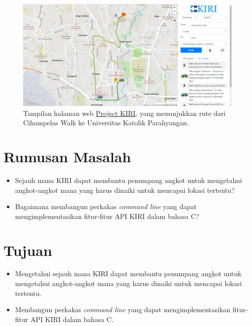 \documentclass[a4paper,twoside]{article}
\begin{document}
\begin{landscape}
    \begin{figure}[ht]
	    \centering
	    \includegraphics[width=\linewidth]{projectkiri}
	    \caption[Tampilan halaman web Project KIRI]{Tampilan halaman web     \href{https://projectkiri.id}{Project KIRI}, yang menunjukkan rute dari Cihampelas Walk ke Universitas Katolik Parahyangan.}
        \label{fig:kiripage}
    \end{figure}
\end{landscape}

\section{Rumusan Masalah}
\begin{itemize}
	\item Sejauh mana KIRI dapat membantu penumpang angkot untuk mengetahui angkot-angkot mana yang harus dinaiki untuk mencapai lokasi tertentu?
	\item Bagaimana membangun perkakas \textit{command line} yang dapat mengimplementasikan fitur-fitur API KIRI dalam bahasa C?
\end{itemize}

\section{Tujuan}
\begin{itemize}
	\item Mengetahui sejauh mana KIRI dapat membantu penumpang angkot untuk mengetahui angkot-angkot mana yang harus dinaiki untuk mencapai lokasi tertentu.
	\item Membangun perkakas \textit{command line} yang dapat mengimplementasikan fitur-fitur API KIRI dalam bahasa C.
\end{itemize}
\end{document}
